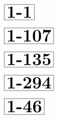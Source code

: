 \documentclass[a4paper, 10pt]{article}
\begin{document}
\thispagestyle{empty}
\begin{minipage}[t]{0.15\textwidth}
                \vspace*{-1.59cm}
        \hspace*{1.25cm}
        $\boxed{\textbf{\Huge1-1}}$
\end{minipage}
\begin{minipage}[t]{0.85\textwidth}
    
\end{minipage}

\begin{minipage}[t]{0.15\textwidth}
                \vspace*{-1.59cm}
        \hspace*{0.25cm}
        $\boxed{\textbf{\Huge1-107}}$
\end{minipage}
\begin{minipage}[t]{0.85\textwidth}
    
\end{minipage}

\begin{minipage}[t]{0.15\textwidth}
                \vspace*{-1.59cm}
        \hspace*{0.25cm}
        $\boxed{\textbf{\Huge1-135}}$
\end{minipage}
\begin{minipage}[t]{0.85\textwidth}
    
\end{minipage}

\begin{minipage}[t]{0.15\textwidth}
                \vspace*{-1.59cm}
        \hspace*{0.25cm}
        $\boxed{\textbf{\Huge1-294}}$
\end{minipage}
\begin{minipage}[t]{0.85\textwidth}
    
\end{minipage}

\begin{minipage}[t]{0.15\textwidth}
                \vspace*{-1.59cm}
        \hspace*{0.75cm}
        $\boxed{\textbf{\Huge1-46}}$
\end{minipage}
\begin{minipage}[t]{0.85\textwidth}
    
\end{minipage}
\end{document}
